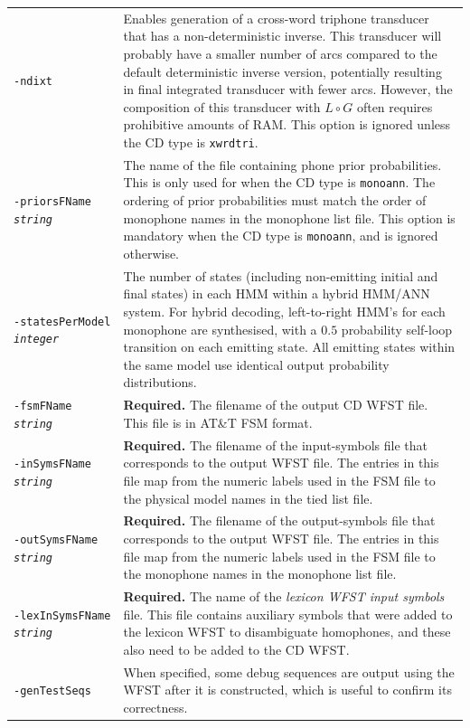 \documentclass[a4paper,12pt]{report}
\begin{document}
\begin{center}
\begin{longtable}{lp{9cm}}
{\tt -ndixt} & Enables generation of a cross-word triphone transducer that has a non-deterministic inverse. This transducer will probably have a smaller number of arcs compared to the default deterministic inverse version, potentially resulting in final integrated transducer with fewer arcs. However, the composition of this transducer with $L{\circ}G$ often requires prohibitive amounts of RAM. This option is ignored unless the CD type is {\tt xwrdtri}. \\
{\tt -priorsFName \emph{string}} & The name of the file containing phone prior probabilities. This is only used for when the CD type is {\tt monoann}. The ordering of prior probabilities must match the order of monophone names in the monophone list file. This option is mandatory when the CD type is {\tt monoann}, and is ignored otherwise. \\
{\tt -statesPerModel \emph{integer}} & The number of states (including non-emitting initial and final states) in each HMM within a hybrid HMM/ANN system. For hybrid decoding, left-to-right HMM's for each monophone are synthesised, with a $0.5$ probability self-loop transition on each emitting state. All emitting states within the same model use identical output probability distributions. \\
{\tt -fsmFName \emph{string}} & {\bf Required.} The filename of the output CD WFST file. This file is in AT\&T FSM format. \\
{\tt -inSymsFName \emph{string}} & {\bf Required.} The filename of the input-symbols file that corresponds to the output WFST file. The entries in this file map from the numeric labels used in the FSM file to the physical model names in the tied list file. \\
{\tt -outSymsFName \emph{string}} & {\bf Required.} The filename of the output-symbols file that corresponds to the output WFST file. The entries in this file map from the numeric labels used in the FSM file to the monophone names in the monophone list file. \\
{\tt -lexInSymsFName \emph{string}} & {\bf Required.} The name of the \emph{lexicon WFST input symbols} file. This file contains auxiliary symbols that were added to the lexicon WFST to disambiguate homophones, and these also need to be added to the CD WFST. \\
{\tt -genTestSeqs} & When specified, some debug sequences are output using the WFST after it is constructed, which is useful to confirm its correctness. \\
\end{longtable}
\end{center}
\end{document}
